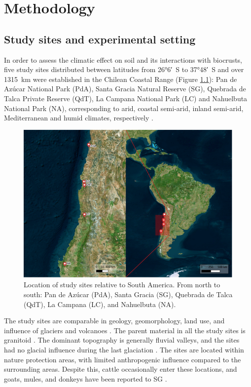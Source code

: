 \chapter{Methodology}

\section{Study sites and experimental setting}
\label{sec:StudysitesAndExperimentalSetting}

In order to assess the climatic effect on soil and its interactions with biocrusts, five study sites distributed between latitudes from \ang{26;6}~S to \ang{37;48}~S and over \SI{1315}{\kilo\meter} were established in the Chilean Coastal Range (Figure \ref{fig:location-map}): Pan de Azúcar National Park (PdA), Santa Gracia Natural Reserve (SG), Quebrada de Talca Private Reserve (QdT), La Campana National Park (LC) and Nahuelbuta National Park (NA), corresponding to arid, coastal semi-arid, inland semi-arid, Mediterranean and humid climates, respectively \citep{Bernhard2018}.

\begin{figure}[H]
	\centering
	\includegraphics[width=1\textwidth]{img/location-map.png}
	\caption{Location of study sites relative to South America. From north to south: Pan de Azúcar (PdA), Santa Gracia (SG), Quebrada de Talca (QdT), La Campana (LC), and Nahuelbuta (NA).}
	\label{fig:location-map}
\end{figure}

The study sites are comparable in geology, geomorphology, land use, and influence of glaciers and volcanoes \citep{Bernhard2018}. The parent material in all the study sites is granitoid \citep{Bernhard2018}. The dominant topography is generally fluvial valleys, and the sites had no glacial influence during the last glaciation \citep{Hulton2002}. The sites are located within nature protection areas, with limited anthropogenic influence compared to the surrounding areas. Despite this, cattle occasionally enter these locations, and goats, mules, and donkeys have been reported to SG \citep{Armesto2007}.

